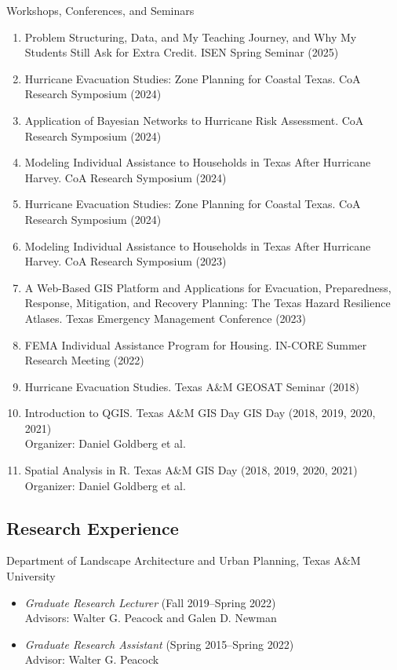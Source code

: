 \documentclass[11pt,oneside]{article}
\begin{document}
\vspace{1pt}

{Workshops, Conferences, and Seminars}
\begin{enumerate}[leftmargin=20pt]
\item Problem Structuring, Data, and My Teaching Journey, and Why My Students Still Ask for Extra Credit. ISEN Spring Seminar (2025)
\item Hurricane Evacuation Studies: Zone Planning for Coastal Texas. CoA Research Symposium (2024)
\item Application of Bayesian Networks to Hurricane Risk Assessment. CoA Research Symposium (2024)
\item Modeling Individual Assistance to Households ​in Texas After Hurricane Harvey. CoA Research Symposium (2024)
\item Hurricane Evacuation Studies: Zone Planning for Coastal Texas. CoA Research Symposium (2024)
\item Modeling Individual Assistance to Households ​in Texas After Hurricane Harvey. CoA Research Symposium (2023)
\item A Web-Based GIS Platform and Applications for Evacuation, Preparedness, Response, Mitigation, and Recovery Planning: The Texas Hazard Resilience Atlases. Texas Emergency Management Conference (2023)
\item FEMA Individual Assistance Program for Housing. IN-CORE Summer Research Meeting (2022)
\item Hurricane Evacuation Studies. Texas A\&M GEOSAT Seminar (2018)
\item Introduction to QGIS. Texas A\&M GIS Day GIS Day (2018, 2019, 2020, 2021)\\
      Organizer: Daniel Goldberg et al.
\item Spatial Analysis in R. Texas A\&M GIS Day (2018, 2019, 2020, 2021)\\
      Organizer: Daniel Goldberg et al.
\end{enumerate}


\subsection*{Research Experience}
{Department of Landscape Architecture and Urban Planning, Texas A\&M University}
\begin{itemize}[leftmargin=20pt]
\item \emph{Graduate Research Lecturer} (Fall 2019--Spring 2022)\\
      Advisors: Walter G. Peacock and Galen D. Newman
\item \emph{Graduate Research Assistant} (Spring 2015--Spring 2022)\\
      Advisor: Walter G. Peacock
\end{itemize}
\end{document}
